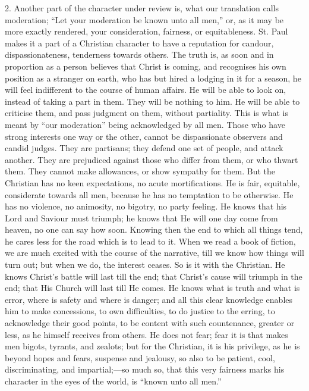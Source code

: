 2. Another part of the character under review is, what our
translation calls moderation; ``Let your moderation be known unto
all men,'' or, as it may be more exactly rendered, your
consideration, fairness, or equitableness. St. Paul makes it a part of
a Christian character to have a reputation for candour,
dispassionateness, tenderness towards others. The truth is, as soon
and in proportion as a person believes that Christ is coming, and
recognises his own position as a stranger on earth, who has but hired
a lodging in it for a season, he will feel indifferent to the course
of human affairs. He will be able to look on, instead of taking a part
in them. They will be nothing to him. He will be able to criticise
them, and pass judgment on them, without partiality. This is what is
meant by ``our moderation'' being acknowledged by all men.
Those who have strong interests one way or the other, cannot be
dispassionate observers and candid judges. They are partisans; they
defend one set of people, and attack another. They are prejudiced
against those who differ from them, or who thwart them. They cannot
make allowances, or show sympathy for them. But the Christian has no
keen expectations, no acute mortifications. He is fair, equitable,
considerate towards all men, because he has no temptation to be
otherwise. He has no violence, no animosity, no bigotry, no party
feeling. He knows that his Lord and Saviour must triumph; he knows
that He will one day come from heaven, no one can say how soon.
Knowing then the end to which all things tend, he cares less for the
road which is to lead to it. When we read a book of fiction, we are
much excited with the course of the narrative, till we know how things
will turn out; but when we do, the interest ceases. So is it with the
Christian. He knows Christ's battle will last till the end; that
Christ's cause will triumph in the end; that His Church will last till
He comes. He knows what is truth and what is error, where is safety
and where is danger; and all this clear knowledge enables him to make
concessions, to own difficulties, to do justice to the erring, to
acknowledge their good points, to be content with such countenance,
greater or less, as he himself receives from others. He does not fear;
fear it is that makes men bigots, tyrants, and zealots; but for the
Christian, it is his privilege, as he is beyond hopes and fears,
suspense and jealousy, so also to be patient, cool, discriminating,
and impartial;—so much so, that this very fairness marks his
character in the eyes of the world, is ``known unto all men.''

